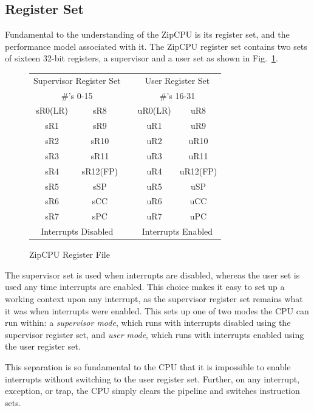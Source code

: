 \documentclass{gqtekspec}
\begin{document}
\subsection{Register Set}

Fundamental to the understanding of the ZipCPU is its register set, and the
performance model associated with it.
The ZipCPU register set contains two sets of sixteen 32-bit registers, a
supervisor and a user set as shown in Fig.~\ref{fig:regset}. 
\begin{figure}\begin{center}
\begin{tabular}{|c|c|c|c|c|}
\multicolumn{2}{c}{Supervisor Register Set} &
	\multicolumn{1}{c}{} &
	\multicolumn{2}{c}{User Register Set} \\
\multicolumn{2}{c}{\#'s 0-15} & \multicolumn{1}{c}{} &
	\multicolumn{2}{c}{\#'s 16-31} \\\hline\hline
sR0(LR)	& sR8	&& uR0(LR) &	uR8	\\\cline{1-2}\cline{4-5}
sR1	& sR9	&& uR1	&	uR9	\\\cline{1-2}\cline{4-5}
sR2	& sR10	&& uR2	&	uR10	\\\cline{1-2}\cline{4-5}
sR3	& sR11	&& uR3	&	uR11	\\\cline{1-2}\cline{4-5}
sR4	& sR12(FP)&& uR4&	uR12(FP)\\\cline{1-2}\cline{4-5}
sR5	& sSP	&& uR5	&	uSP	\\\cline{1-2}\cline{4-5}
sR6	& sCC	&& uR6	&	uCC	\\\cline{1-2}\cline{4-5}
sR7	& sPC	&& uR7	&	uPC	\\\hline\hline
\multicolumn{2}{c}{Interrupts Disabled} &
	\multicolumn{1}{c}{} &
	\multicolumn{2}{c}{Interrupts Enabled} \\
\end{tabular}
\caption{ZipCPU Register File}\label{fig:regset}
\end{center}\end{figure}
The supervisor set is used when interrupts are disabled, whereas the user set
is used any time interrupts are enabled.  This choice makes it easy to set up
a working context upon any interrupt, as the supervisor register set remains
what it was when interrupts were enabled.  This sets up one of two modes
the CPU can run within: a {\em supervisor mode}, which runs with interrupts
disabled using the supervisor register set, and {\em user mode}, which runs
with interrupts enabled using the user register set.

This separation is so fundamental to the CPU that it is impossible to enable
interrupts without switching to the user register set.   Further, on any
interrupt, exception, or trap, the CPU simply clears the pipeline and switches
instruction sets.
\end{document}
